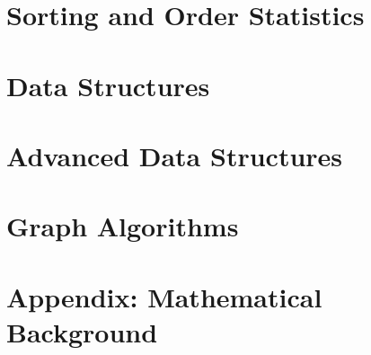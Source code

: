 \documentclass[12pt]{article}
\let\oldpart\part%
\renewcommand{\part}{\clearpage\oldpart}%
\begin{document}

\thispagestyle{empty} %

\clearpage
{}
\setcounter{tocdepth}{3}
\tableofcontents
\clearpage
\listofalgo
{}

\clearpage
{}








\part{Sorting and Order Statistics}




\part{Data Structures}








\part{Advanced Data Structures}




\clearpage
\part{Graph Algorithms}














\appendix
\clearpage
\part{Appendix: Mathematical Background}








\clearpage
{}
{}


\nocite{*}
\end{document}
